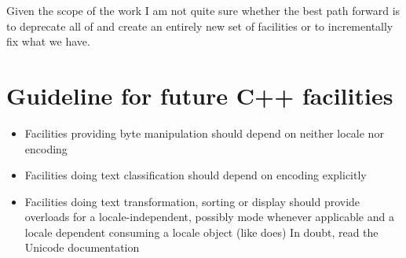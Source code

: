 \documentclass{wg21}
\begin{document}
Given the scope of the work I am not quite sure whether the best path forward is to deprecate all of  and create an entirely new set of facilities or to incrementally fix what we have.


\section{Guideline for future C++ facilities}

\begin{itemize}
\item Facilities providing byte manipulation should depend on neither locale nor encoding
\item Facilities doing text classification should depend on encoding explicitly 
\item Facilities doing text transformation, sorting or display should provide overloads for a locale-independent, possibly  mode whenever applicable and a locale dependent consuming a locale object (like  does)
In doubt, read the Unicode documentation
\end{itemize}



\end{document}
